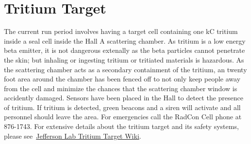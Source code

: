 \section{Tritium Target}

The current run period involves having a target cell containing one kC tritium inside a seal cell
inside the Hall A scattering
chamber.    As tritium is a low energy beta emitter, it is not dangerous extenally as the beta particles 
cannot penetrate the skin; but inhaling or ingesting tritium or tritiated materials is hazardous. 
As the scattering chamber acts as a secondary containment of the tritium, an twenty foot area around
the chamber has been fenced off to not only keep people away from the cell and minimize the chances
that the scattering chamber window is accidently damaged.
Sensors have been placed in the Hall to detect the presence of tritium.   If tritium is detected,
green beacons and a siren will activate and all personnel should leave the area.   
For emergencies call the RadCon Cell phone at 876-1743.   For extensive details about the tritium
target and its safety systems, please 
see~\href{https://wiki.jlab.org/jlab_tritium_target_wiki/index.php/Main_Page}{Jefferson Lab Tritium Target Wiki}.

